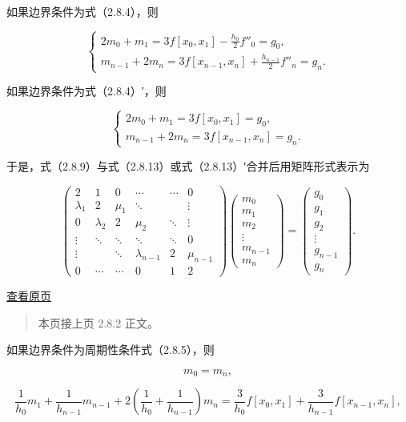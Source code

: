 \documentclass[
  10pt,
  fontset=fandol]{ctexart}
\begin{document}
如果边界条件为式（2.8.4），则

\[\begin{cases}
\displaystyle2m_0+m_1=3f[x_0,x_1]-\frac{h_0}2f''_0=g_0,\\[6pt]
\displaystyle m_{n-1}+2m_n=3f[x_{n-1},x_n]+\frac{h_{n-1}}2f''_n=g_n.
\end{cases}\tag{2.8.13}\]

如果边界条件为式（2.8.4）′，则

\[\begin{cases}
2m_0+m_1=3f[x_0,x_1]=g_0,\\
m_{n-1}+2m_n=3f[x_{n-1},x_n]=g_n.
\end{cases}\tag{2.8.13'}\]

于是，式（2.8.9）与式（2.8.13）或式（2.8.13）′合并后用矩阵形式表示为

\[\begin{pmatrix}
2&1&0&\cdots&\cdots&0\\
\lambda_1&2&\mu_1&\ddots&&\vdots\\
0&\lambda_2&2&\mu_2&\ddots&\vdots\\
\vdots&\ddots&\ddots&\ddots&\ddots&0\\
\vdots&&\ddots&\lambda_{n-1}&2&\mu_{n-1}\\
0&\cdots&\cdots&0&1&2
\end{pmatrix}
\begin{pmatrix}m_0\\m_1\\m_2\\\vdots\\m_{n-1}\\m_n\end{pmatrix}
=\begin{pmatrix}g_0\\g_1\\g_2\\\vdots\\g_{n-1}\\g_n\end{pmatrix}.\tag{2.8.14}\]

\href{../../source-images/pdf-052.jpeg}{查看原页}

\begin{quote}
本页接上页 2.8.2 正文。
\end{quote}

如果边界条件为周期性条件式（2.8.5），则

\[m_0=m_n,\]

\[\frac1{h_0}m_1+\frac1{h_{n-1}}m_{n-1}+2\left(\frac1{h_0}+\frac1{h_{n-1}}\right)m_n=\frac3{h_0}f[x_0,x_1]+\frac3{h_{n-1}}f[x_{n-1},x_n],\]
\end{document}

